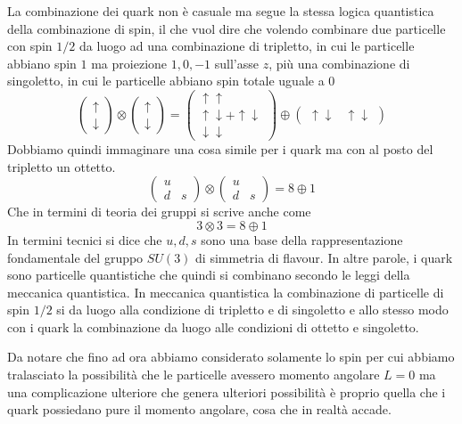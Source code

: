 La combinazione dei quark non è casuale ma segue la stessa logica quantistica della combinazione di spin, il che vuol dire che volendo combinare due particelle con spin $1/2$ da luogo ad una combinazione di tripletto, in cui le particelle abbiano spin $1$ ma proiezione $1, 0, -1$ sull'asse $z$, più una combinazione di singoletto, in cui le particelle abbiano spin totale uguale a $0$
\begin{equation}
\begin{pmatrix}
\uparrow\\\downarrow
\end{pmatrix}
\otimes
\begin{pmatrix}
\uparrow\\\downarrow
\end{pmatrix}
=
\begin{pmatrix}
\uparrow\uparrow\\
\uparrow\downarrow+\uparrow\downarrow\\
\downarrow\downarrow
\end{pmatrix}
\oplus
\begin{pmatrix}
\uparrow\downarrow&\uparrow\downarrow
\end{pmatrix}
\end{equation}
Dobbiamo quindi immaginare una cosa simile per i quark ma con al posto del tripletto un ottetto.
\begin{equation}
\begin{pmatrix}
u&\\
d&s
\end{pmatrix}
\otimes
\begin{pmatrix}
u&\\
d&s
\end{pmatrix}
=
8\oplus 1
\end{equation}
Che in termini di teoria dei gruppi si scrive anche come
\begin{equation}
3 \otimes 3= 8 \oplus 1
\end{equation}
In termini tecnici si dice che $u, d, s$ sono una base della rappresentazione fondamentale del gruppo $SU(3) $ di simmetria di flavour.
In altre parole, i quark sono particelle quantistiche che quindi si combinano secondo le leggi della meccanica quantistica.
In meccanica quantistica la combinazione di particelle di spin $1/2$ si da luogo alla condizione di tripletto e di singoletto e allo stesso modo con i quark la combinazione da luogo alle condizioni di ottetto e singoletto.

Da notare che fino ad ora abbiamo considerato solamente lo spin per cui abbiamo tralasciato la possibilità che le particelle avessero momento angolare $L=0$ ma una complicazione ulteriore che genera ulteriori possibilità è proprio quella che i quark possiedano pure il momento angolare, cosa che in realtà accade.

